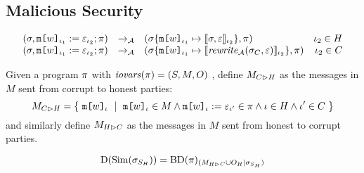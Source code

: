 \subsection{Malicious Security}

$$
\begin{array}{rclr}
  (\sigma, \texttt{m[}w\texttt{]}_{\iota_1} := \varepsilon_{\iota_2};\pi) &\xrightarrow{}_{\mathcal{A}}&
  (\sigma\{\texttt{m[}w\texttt{]}_{\iota_1} \mapsto \llbracket \sigma,\varepsilon \rrbracket_{\iota_2}\}, \pi) & \iota_2 \in H\\
  (\sigma, \texttt{m[}w\texttt{]}_{\iota_1} := \varepsilon_{\iota_2};\pi) &\xrightarrow{}_{\mathcal{A}}&
  (\sigma\{\texttt{m[}w\texttt{]}_{\iota_1} \mapsto \llbracket \mathit{rewrite}_{\mathcal{A}}(\sigma_C,\varepsilon) \rrbracket_{\iota_2}\}, \pi) & \iota_2 \in C
\end{array}
$$

\begin{definition}
  Given a program $\pi$ with $\mathit{iovars}(\pi) = (S,M,O)$ , define $M_{C \rhd H}$ as the
  messages in $M$ sent from corrupt to honest parties:
  $$
  \cinputs = \{\ \elab{\mesg{w}}{\cid}\ \mid\  \elab{\mesg{w}}{\cid} \in M \wedge \eassign{\mesg{w}}{\cid}{\be}{\cid'} \in \prog
  \wedge \cid \in H \wedge \cid' \in C \ \} 
  $$
  and similarly define $M_{H \rhd C}$ as the messages in $M$ sent from honest to corrupt parties.
\end{definition}

$$
\mathrm{D}(\mathrm{Sim}(\sigma_{S_H})) = \mathrm{BD}(\pi)_{({M_{H \rhd C} \cup O_H}|{\sigma_{S_H}})}
$$
